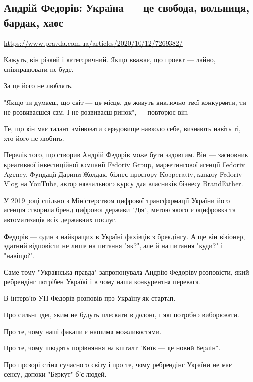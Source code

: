  
 

\subsection{Андрій Федорів: Україна --- це свобода, вольниця, бардак, хаос}
\label{sec:12_10_2020.news.pravda_com_ua.1_fedoriv_ukraine}

\url{https://www.pravda.com.ua/articles/2020/10/12/7269382/}

Кажуть, він різкий і категоричний. Якщо вважає, що проект --- лайно,
співпрацювати не буде.

За це його не люблять.

"Якщо ти думаєш, що світ --- це місце, де живуть виключно твої конкуренти, ти не
розвиваєшся сам. І не розвиваєш ринок", --- повторює він.

Те, що він має талант змінювати середовище навколо себе, визнають навіть ті,
хто його не любить.

Перелік того, що створив Андрій Федорів може бути задовгим. Він --- засновник
креативної інвестиційної компанії Fedoriv Group, маркетингової агенції Fedoriv
Agеncy, Фундації Дарини Жолдак, бізнес-простору Kooperativ, каналу Fedoriv Vlog
на YouTube, автор навчального курсу для власників бізнесу BrandFather.

У 2019 році спільно з Міністерством цифрової трансформації України його агенція
створила бренд цифрової держави "Дія", метою якого є оцифровка та автоматизація
всіх державних послуг.

Федорів --- один з найкращих в Україні фахівців з брендінгу. А ще він візіонер,
здатний відповісти не лише на питання "як?", але й на питання "куди?" і
"навіщо?".

Саме тому "Українська правда" запропонувала Андрію Федоріву розповісти, який
ребрендінг потрібен Україні і в чому наша конкурентна перевага.

В інтерв’ю УП Федорів розповів про Україну як стартап.

Про сильні ідеї, яким не будуть плескати в долоні, і які потрібно виборювати.

Про те, чому наші факапи є нашими можливостями.

Про те, чому шкодять порівняння на кшталт "Київ --- це новий Берлін".

Про прозорі стіни сучасного світу і про те, чому ребрендінг України не має
сенсу, допоки "Беркут" б’є людей.

